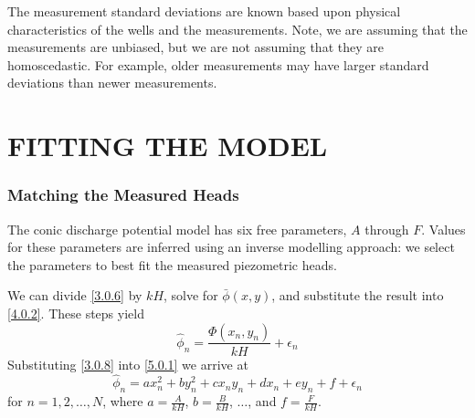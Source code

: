 \documentclass[12pt]{report}
\begin{document}
The measurement standard deviations are known based upon physical characteristics of the wells and the measurements.  Note, we are assuming that the measurements are unbiased, but we are not assuming that they are homoscedastic. For example, older measurements may have larger standard deviations than newer measurements.


\chapter{FITTING THE MODEL}
\subsection{Matching the Measured Heads}
The conic discharge potential model has six free parameters, $A$ through $F$.  Values for these parameters are inferred using an inverse modelling approach: we select the parameters to best fit the measured piezometric heads.

We can divide \eqref{3.0.6} by $kH$, solve for $\bar{\phi}(x,y)$, and substitute the result into \eqref{4.0.2}. These steps yield
%
\begin{equation}\label{5.0.1}
    \hat{\phi}_n = \frac{\Phi(x_n, y_n)}{kH} + \epsilon_n
\end{equation}
%
Substituting \eqref{3.0.8} into \eqref{5.0.1} we arrive at
%
\begin{equation} \label{5.0.2}
    \hat{\phi}_n = a x_n^2 + b y_n^2 + c x_n y_n + d x_n + e y_n + f + \epsilon_n
\end{equation}
%
for $n = 1, 2, \ldots, N$, where $a = \frac{A}{kH}$, $b = \frac{B}{kH}$, $ \ldots$, and $f = \frac{F}{kH}$.

\end{document}
